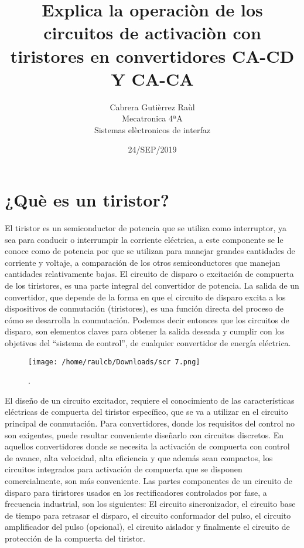 \documentclass[11pt]{article}
\title{\textbf{Explica la operaciòn de los circuitos de activaciòn con tiristores en convertidores CA-CD Y CA-CA}}
\author{Cabrera Gutièrrez Raùl\\
		Mecatronica 4ªA\\
		Sistemas elèctronicos de interfaz}
\date{24/SEP/2019 }
\begin{document}
\maketitle 


\section{¿Què es un tiristor?}

El tiristor es un semiconductor de potencia que se utiliza como interruptor, ya sea para conducir o interrumpir la corriente eléctrica, a este componente se le conoce como de potencia por que se utilizan para manejar grandes cantidades de corriente y voltaje, a comparación de los otros semiconductores que manejan cantidades relativamente bajas.
El circuito de disparo o excitación de compuerta de los tiristores, es una parte integral del convertidor de potencia. La salida de un convertidor, que depende de la forma en que el circuito de disparo excita a los dispositivos de conmutación (tiristores), es una función directa del proceso de cómo se desarrolla la conmutación. Podemos decir entonces que los circuitos de disparo, son elementos claves para obtener la salida deseada y cumplir con los objetivos del “sistema de control”, de cualquier convertidor de energía eléctrica.
\\ 

\begin{figure}[htp]
\centering
\texttt{[image: /home/raulcb/Downloads/scr 7.png]}
\caption{.}
\label{.}
\end{figure}



El diseño de un circuito excitador, requiere el conocimiento de las características eléctricas de compuerta del tiristor específico, que se va a utilizar en el circuito principal de conmutación. Para convertidores, donde los requisitos del control no son exigentes, puede resultar conveniente diseñarlo con circuitos discretos. En aquellos convertidores donde se necesita la activación de compuerta con control de avance, alta velocidad, alta eficiencia y que además sean compactos, los circuitos integrados para activación de compuerta que se disponen comercialmente, son más conveniente. Las partes componentes de un circuito de disparo para tiristores usados en los rectificadores controlados por fase, a frecuencia industrial, son los siguientes: El circuito sincronizador, el circuito base de tiempo para retrasar el disparo, el circuito conformador del pulso, el circuito amplificador del pulso (opcional), el circuito aislador y finalmente el circuito de protección de la compuerta del tiristor. 
\end{document}
